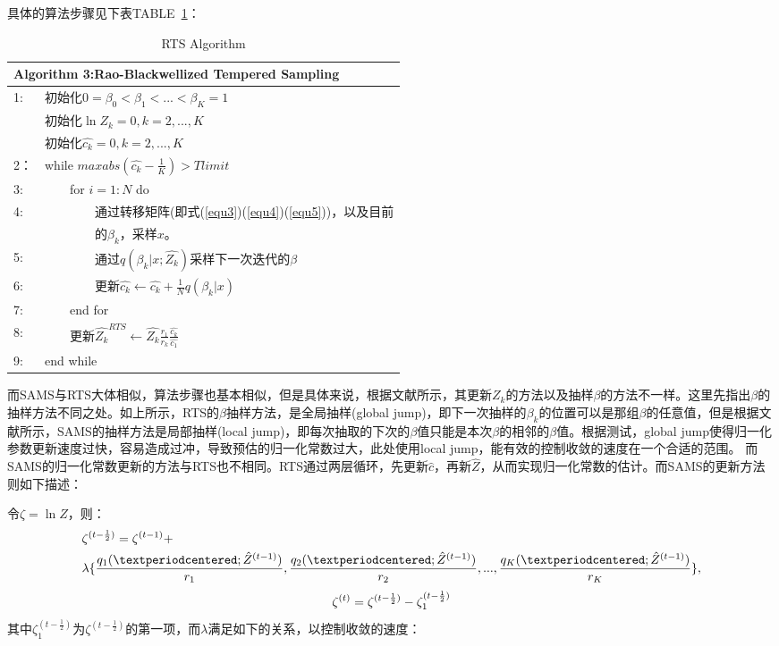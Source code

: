 \documentclass[journal,a4paper]{IEEEtran}
\begin{document}
	具体的算法步骤见下表TABLE~\ref{tab3}：
	\begin{table}[h]
		\begin{tabular}{ll}
			\hline
			\multicolumn{2}{l}{\textbf{Algorithm 3:}Rao-Blackwellized Tempered Sampling} \\
			\hline
			1: & 初始化$ 0=\beta_0<\beta_1<...<\beta_K=1$\\
			   & 初始化$\ln Z_k=0,k=2,...,K$ \\
			   & 初始化$\hat{c_k}=0,k=2,...,K$ \\
			2：& while $max{abs(\hat{c_k}-\frac{1}{K})}>Tlimit$\\
			3: & ~~~~for $i = 1 : N$ do \\
			4: & ~~~~~~~~通过转移矩阵(即式(\ref{equ3})(\ref{equ4})(\ref{equ5}))，以及目前 \\
			   & ~~~~~~~~的$\beta_k$，采样$x$。\\
			5: & ~~~~~~~~通过$q(\beta_k|x;\hat{Z_k})$采样下一次迭代的$\beta$ \\
			6: & ~~~~~~~~更新$\hat{c_k} \leftarrow \hat{c_k} + \frac{1}{N} q(\beta_k|x)$ \\
			7: & ~~~~end for\\
			8: & ~~~~更新$\hat{Z_k}^{RTS} \leftarrow \hat{Z_k}\frac{r_1}{r_k} \frac{\hat{c_k}}{\hat{c_1}}$ \\
			9: & end while\\

			\hline
		\end{tabular}
		\caption{RTS Algorithm}
		\label{tab3}
	\end{table}

	而SAMS与RTS大体相似，算法步骤也基本相似，但是具体来说，根据文献\cite{tan2015optimally}所示，其更新$Z_k$的方法以及抽样$\beta$的方法不一样。这里先指出$\beta$的抽样方法不同之处。如上所示，RTS的$\beta$抽样方法，是全局抽样(global jump)，即下一次抽样的$\beta_k$的位置可以是那组$\beta$的任意值，但是根据文献\cite{salakhutdinov2009learning}所示，SAMS的抽样方法是局部抽样(local jump)，即每次抽取的下次的$\beta$值只能是本次$\beta$的相邻的$\beta$值。根据测试，global jump使得归一化参数更新速度过快，容易造成过冲，导致预估的归一化常数过大，此处使用local jump，能有效的控制收敛的速度在一个合适的范围。
	而SAMS的归一化常数更新的方法与RTS也不相同。RTS通过两层循环，先更新$\hat{c}$，再新$\hat{Z}$，从而实现归一化常数的估计。而SAMS的更新方法则如下描述：
	
	令$\zeta = \ln Z$，则：
	\begin{align}
		& \zeta^{(t-\frac{1}{2})} = \zeta^{(t-1)} + \notag \\ 
		& \lambda\{\frac{q_1(·;\hat{Z}^{(t-1)})}{r_1},\frac{q_2(·;\hat{Z}^{(t-1)})}{r_2},...,\frac{q_K(·;\hat{Z}^{(t-1)})}{r_K}\},
	\end{align}
	\begin{equation}
		\zeta^{(t)} = \zeta^{(t-\frac{1}{2})} - \zeta_1^{(t-\frac{1}{2})} \notag
	\end{equation}
	其中$\zeta_1^{(t-\frac{1}{2})}$为$\zeta^{(t-\frac{1}{2})}$的第一项，而$\lambda$满足如下的关系，以控制收敛的速度：
	
\end{document}
